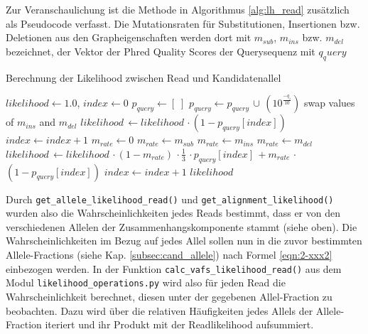 Zur Veranschaulichung ist die Methode in Algorithmus \ref{alg:lh_read} zusätzlich als Pseudocode verfasst. Die Mutationsraten für Substitutionen, Insertionen bzw. Deletionen aus den Grapheigenschaften werden dort mit $ m_{sub} $, $ m_{ins} $ bzw. $ m_{del} $ bezeichnet, der Vektor der Phred Quality Scores der Querysequenz mit $q_query$
\newpage
\begin{algorithm}[H]
	\caption{Berechnung der Likelihood zwischen Read und Kandidatenallel}  \label{alg:lh_read}
	\begin{algorithmic}[1]	
		\State $ likelihood \gets 1.0 $, $ index \gets 0 $
		\State $ p_{query} \gets [\;] $
		\State $p_{query} \gets p_{query}\, \cup \, (10^{\frac{-q_{i}}{10}}) $
		\EndFor			
		\State swap values of $ m_{ins} $ and $ m_{del} $
		\EndIf
		\State $ likelihood\, \gets likelihood \,\cdotp (1-p_{query}[index]) $
		\State $ index \gets index + 1 $
		\EndWhile
		\EndIf
		\State $ m_{rate} \gets 0 $
		\State $ m_{rate} \gets m_{sub} $
		\EndIf
		\State $ m_{rate} \gets m_{ins} $
		\EndIf
		\State $ m_{rate} \gets m_{del} $
		\EndIf
		\State $ likelihood\, \gets likelihood \,\cdotp (1 - m_{rate})\,\cdotp \frac{1}{3} \,\cdotp p_{query}[index] \, +  m_{rate}\,\cdotp $         
		\State \hspace{63pt}  $ (1 - p_{query}[index]) $ 		        
		\State $ index \gets index + 1 $
		\EndWhile
		\EndIf
		\EndFor
		\State \Return $likelihood$
		\EndFunction		
	\end{algorithmic}
\end{algorithm}

Durch \lstinline|get_allele_likelihood_read()| und \lstinline|get_alignment_likelihood()| wurden also die Wahrscheinlichkeiten jedes Reads bestimmt, dass er von den verschiedenen Allelen der Zusammenhangskomponente stammt (siehe oben). Die Wahrscheinlichkeiten im Bezug auf jedes Allel sollen nun in die zuvor bestimmten Allele-Fractions (siehe Kap. \ref{subsec:cand_allele}) nach Formel \eqref{eqn:2-xxx2} einbezogen werden. In der Funktion \lstinline|calc_vafs_likelihood_read()| aus dem Modul \lstinline|likelihood_operations.py| wird also für jeden Read die Wahrscheinlichkeit berechnet, diesen unter der gegebenen Allel-Fraction zu beobachten. Dazu wird über die relativen Häufigkeiten jedes Allels der Allele-Fraction iteriert und ihr Produkt mit der Readlikelihood aufsummiert. \\

